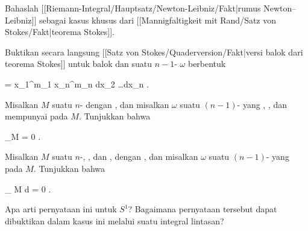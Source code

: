 \setcounter{section}{23}


{}
{

Bahaslah
[[Riemann-Integral/Hauptsatz/Newton-Leibniz/Fakt|rumus Newton--Leibniz]]
sebagai kasus khusus dari
[[Mannigfaltigkeit mit Rand/Satz von Stokes/Fakt|teorema Stokes]].

}
{} {}

{}
{

Buktikan secara langsung
[[Satz von Stokes/Quaderversion/Fakt|versi balok dari teorema Stokes]]
untuk balok
\mathl{[a_1,b_1] \times \cdots \times [a_n,b_n]}{} dan suatu
$n-1$-
$\omega$ berbentuk

\mavergleichskettedisp
{\vergleichskette
{ \omega
}
{ =} { x_1^{m_1 } \cdots x_n^{m_n }  dx_2 \wedge \ldots \wedge dx_n
}
{ } {
}
{ } {
}
{ } {
}
}
{}{}{.}

}
{} {}

{}
{

Misalkan $M$ suatu
$n$-
dengan
,
dan misalkan $\omega$ suatu $(n-1)$-
yang
,
, dan mempunyai
pada $M$. Tunjukkan bahwa

\mavergleichskettedisp
{\vergleichskette
{ \int_{\partial M} \omega
}
{ =} { 0
}
{ } {
}
{ } {
}
{ } {
}
}
{}{}{.}

}
{} {}

{}
{

Misalkan $M$ suatu
$n$-,
, dan
 {} {},
dengan
,
dan misalkan $\omega$ suatu
$(n-1)$-
yang
pada $M$. Tunjukkan bahwa

\mavergleichskettedisp
{\vergleichskette
{
\int_{ M  }  d\omega
}
{ =} { 0
}
{ } {
}
{ } {
}
{ } {
}
}
{}{}{.}

}
{Apa arti pernyataan ini untuk $S^1$? Bagaimana pernyataan tersebut dapat dibuktikan dalam kasus ini melalui suatu integral lintasan?} {}

